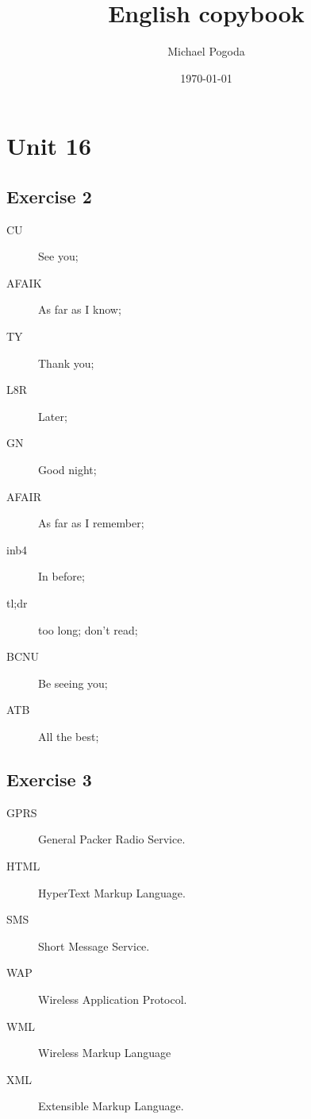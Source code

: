 \documentclass[a5paper,10pt,notitlepage,pdftex,headsepline]{scrartcl}
\author{Michael Pogoda}
\title{English copybook}
\date{\today}
\begin{document}
\begin{titlepage}
  \maketitle
\end{titlepage}

\section{Unit 16}
  \subsection{Exercise 2}
    \begin{minipage}{0.5\textwidth}
      \begin{description}
        \item[CU] See you;
        \item[AFAIK] As far as I know;
        \item[TY] Thank you;
        \item[L8R] Later;
        \item[GN] Good night;
      \end{description}
    \end{minipage}
    \begin{minipage}{0.5\textwidth}
      \begin{description}
        \item[AFAIR] As far as I remember;
        \item[inb4] In before;
        \item[tl;dr] too long; don't read;
        \item[BCNU] Be seeing you;
        \item[ATB] All the best;
      \end{description}
    \end{minipage}
  \subsection{Exercise 3}
    \begin{minipage}{0.5\textwidth}
      \begin{description}
        \item[GPRS] General Packer Radio Service.
        \item[HTML] HyperText Markup Language.
        \item[SMS] Short Message Service.
      \end{description}
    \end{minipage}
    \begin{minipage}{0.5\textwidth}
      \begin{description}
        \item[WAP] Wireless Application Protocol.
        \item[WML] Wireless Markup Language
        \item[XML] Extensible Markup Language.
      \end{description}
    \end{minipage}
\end{document}
